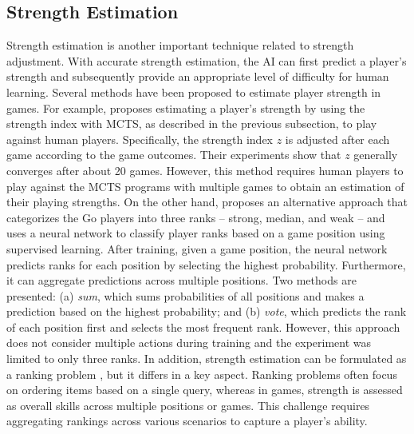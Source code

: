 \subsection{Strength Estimation}
\label{subsec:bg_se}
Strength estimation is another important technique related to strength adjustment.
With accurate strength estimation, the AI can first predict a player's strength and subsequently provide an appropriate level of difficulty for human learning.
Several methods \citep{moudřík_determining_2016, liu_strength_2020, egri-nagy_derived_2020, scheible_picking_2014} have been proposed to estimate player strength in games.
For example, \citet{liu_strength_2020} proposes estimating a player's strength by using the strength index with MCTS, as described in the previous subsection, to play against human players.
Specifically, the strength index $z$ is adjusted after each game according to the game outcomes.
Their experiments show that $z$ generally converges after about 20 games.
However, this method requires human players to play against the MCTS programs with multiple games to obtain an estimation of their playing strengths.
On the other hand, \citet{moudřík_determining_2016} proposes an alternative approach that categorizes the Go players into three ranks -- strong, median, and weak -- and uses a neural network to classify player ranks based on a game position using supervised learning.
After training, given a game position, the neural network predicts ranks for each position by selecting the highest probability.
Furthermore, it can aggregate predictions across multiple positions.
Two methods are presented: (a) \textit{sum}, which sums probabilities of all positions and makes a prediction based on the highest probability; and (b) \textit{vote}, which predicts the rank of each position first and selects the most frequent rank.
However, this approach does not consider multiple actions during training and the experiment was limited to only three ranks.
In addition, strength estimation can be formulated as a ranking problem \citep{burges_learning_2005, xia_listwise_2008}, but it differs in a key aspect.
Ranking problems often focus on ordering items based on a single query, whereas in games, strength is assessed as overall skills across multiple positions or games.
This challenge requires aggregating rankings across various scenarios to capture a player's ability.


